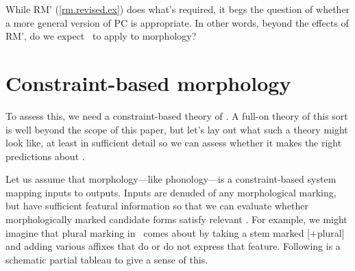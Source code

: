 \documentclass[output=paper,
modfonts
]{LSP/langsci}
\begin{document}
While RM' (\ref{rm.revised.ex}) does what's required, it begs the question of whether a more general version of PC is appropriate. In other words, beyond the effects of RM', do we expect \io\ to apply to morphology?

\section{Constraint-based morphology}

To assess this, we need a constraint-based theory of .  A full-on theory of this sort is well beyond the scope of this paper, but let's lay out what such a theory might look like, at least in sufficient detail so we can assess whether it makes the right predictions about \io.

Let us assume that morphology---like phonology---is a constraint-based system mapping inputs to outputs. Inputs are denuded of any morphological marking, but have sufficient featural information so that we can evaluate whether morphologically marked candidate forms satisfy relevant . For example, we might imagine that plural marking in \e\ comes about by taking a stem marked [+plural] and adding various affixes  that do or do not express that feature.  Following is a schematic partial tableau to give a sense of this.
\end{document}
